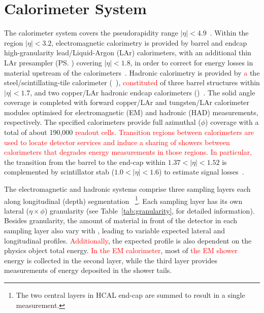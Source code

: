 \section{Calorimeter System}\label{ssec:calo}


%



The calorimeter system covers the pseudorapidity
range \(|\eta| < 4.9\)~\cite{PERF-2007-01}. Within the region \(|\eta|< 3.2\),
electromagnetic calorimetry is provided by barrel and endcap high-granularity
lead/Liquid-Argon (LAr) calorimeters, with an additional thin LAr presampler
(\ps) covering \(|\eta| < 1.8\), in order to correct for energy losses in
material upstream of the calorimeters~\cite{LARG-2009-01,larg_tdr}. Hadronic
calorimetry is provided by \textcolor{red}{a} the steel/scintillating-tile calorimeter
(\tilecal~\cite{TCAL-2017-01,tile_tdr}), \textcolor{red}{constituted} of three barrel structures
within \(|\eta| < 1.7\), and two copper/LAr hadronic endcap calorimeters
(\hec)~\cite{cal_tdr}.  The solid angle coverage is completed with forward
copper/LAr and tungsten/LAr calorimeter modules optimised for electromagnetic
(EM) and hadronic (HAD) measurements, respectively. The specified calorimeters
provide full azimuthal ($\phi$) coverage with a total of about 190,000 \textcolor{red}{readout cells. Transition regions between calorimeters are used to locate detector services and induce a sharing of showers between calorimeters that degrades energy measurements in those regions. In particular,} the transition from the barrel to the end-cap within
$1.37<|\eta|<1.52$ is complemented by scintillator stab ($1.0<|\eta|<1.6$) to
estimate signal losses~\cite{cal_tdr}.

The electromagnetic and hadronic systems comprise three sampling layers each along longitudinal (depth) segmentation ~\cite{PERF-2007-01}\footnote{The two
central layers in HCAL end-cap are summed to result in a single measurement.}.
Each sampling layer has its own lateral ($\eta\times\phi$) granularity (see Table~\ref{tab:granularity}, for detailed information). Besides granularity, the amount of material in front of the detector in each sampling layer also vary with \abseta, leading to variable expected lateral and longitudinal profiles. \textcolor{red}{Additionally}, the expected
profile is also dependent on the physics object total energy. \textcolor{red}{In the EM calorimeter}, most of \textcolor{red}{the EM shower} energy is collected in the second layer, while the third layer provides measurements
of energy deposited in the shower tails. %

